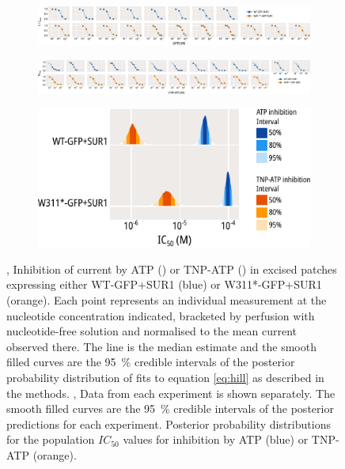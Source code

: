 \begin{figure}[hbtp]
\begin{subfigure}[t]{0.45\textwidth}
	\end{subfigure}
	\vfill
	\begin{subfigure}[t]{0.9\textwidth}
		\caption{}\label{ch3fig:atp_inhibition_2}
		\centering
		\includegraphics[width=\textwidth]{atp_inhibition_2.pdf}
	\end{subfigure}
	\vfill
	\begin{subfigure}[t]{0.9\textwidth}
		\caption{}\label{ch3fig:tnpatp_inhibition_2}
		\centering
		\includegraphics[width=\textwidth]{tnpatp_inhibition_2.pdf}
	\end{subfigure}
	\vfill
	\begin{subfigure}[t]{0.6\textwidth}
		\caption{}\label{ch3fig:ec50_fits_1}
		\centering
		\includegraphics[width=\textwidth]{ec50_fits_1.pdf}
	\end{subfigure}
	\caption[WT-GFP and W311*-GFP electrophysiology]{
	,  Inhibition of current by ATP () or TNP-ATP () in excised patches expressing either WT-GFP+SUR1 (blue) or W311*-GFP+SUR1 (orange).
	Each point represents an individual measurement at the nucleotide concentration indicated, bracketed by perfusion with nucleotide-free solution and normalised to the mean current observed there.
	The line is the median estimate and the smooth filled curves are the \SI{95}{\percent} credible intervals of the posterior probability distribution of fits to equation \ref{eq:hill} as described in the methods.
	,  Data from each experiment is shown separately.
	The smooth filled curves are the \SI{95}{\percent} credible intervals of the posterior predictions for each experiment.
	 Posterior probability distributions for the population $IC_{50}$ values for inhibition by ATP (blue) or TNP-ATP (orange).
	}
\end{figure}


